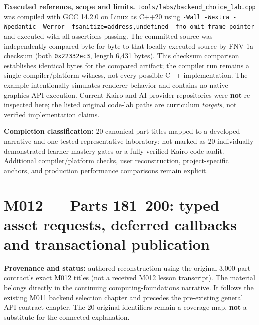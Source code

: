 \textbf{Executed reference, scope and limits.} \texttt{tools/labs/backend\_choice\_lab.cpp} was compiled with GCC 14.2.0 on Linux as C++20 using \texttt{-Wall\ -Wextra\ -Wpedantic\ -Werror\ -fsanitize=address,undefined\ -fno-omit-frame-pointer} and executed with all assertions passing. The committed source was independently compared byte-for-byte to that locally executed source by FNV-1a checksum (both \texttt{0x22332ec3}, length 6,431 bytes). This checksum comparison establishes identical bytes for the compared artifact; the compiler run remains a single compiler/platform witness, not every possible C++ implementation. The example intentionally simulates renderer behavior and contains no native graphics API execution. Current Kairo and AI-provider repositories were \textbf{not} re-inspected here; the listed original code-lab paths are curriculum \emph{targets}, not verified implementation claims.

\textbf{Completion classification:} 20 canonical part titles mapped to a developed narrative and one tested representative laboratory; not marked as 20 individually demonstrated learner mastery gates or a fully verified Kairo code audit. Additional compiler/platform checks, user reconstruction, project-specific anchors, and production performance comparisons remain explicit.

\section{M012 --- Parts 181--200: typed asset requests, deferred callbacks and transactional publication}\label{appendix-fd090d982a15-m012-parts-181200-typed-asset-requests-deferred-callbacks-and-transactional-publication}

\textbf{Provenance and status:} authored reconstruction using the original 3,000-part contract's exact M012 titles (not a received M012 lesson transcript). The material belongs directly in \href{Continuous\%20Notes/Computing\%20Foundations\%20-\%20From\%20Bits\%20to\%20C++\%20and\%20Systems\%20APIs\#From\%20an\%20accepted\%20render\%20request\%20to\%20a\%20resource\%20that\%20survives\%20failures\%20and\%20callbacks}{the continuing computing-foundations narrative}. It follows the existing M011 backend selection chapter and precedes the pre-existing general API-contract chapter. The 20 original identifiers remain a coverage map, \textbf{not} a substitute for the connected explanation.

